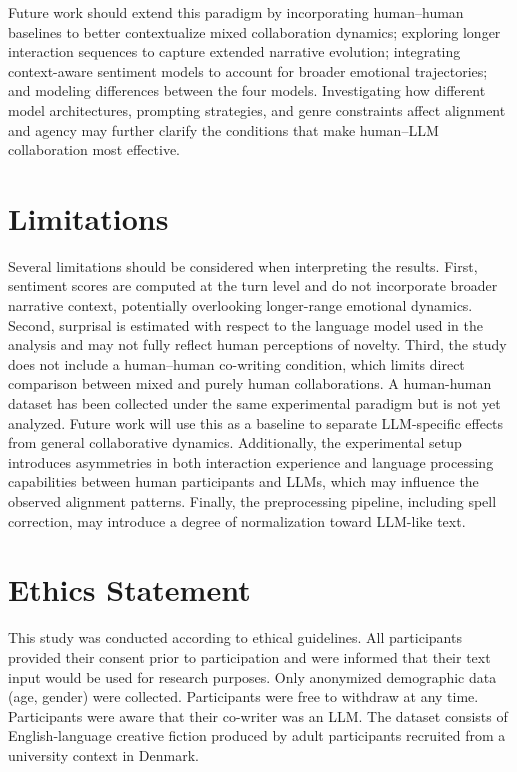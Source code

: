 \documentclass[11pt]{article}
\begin{document}
Future work should extend this paradigm by incorporating human–human baselines to better contextualize mixed collaboration dynamics; exploring longer interaction sequences to capture extended narrative evolution; integrating context-aware sentiment models to account for broader emotional trajectories; and modeling differences between the four models. Investigating how different model architectures, prompting strategies, and genre constraints affect alignment and agency may further clarify the conditions that make human–LLM collaboration most effective.


\section*{Limitations}
Several limitations should be considered when interpreting the results. First, sentiment scores are computed at the turn level and do not incorporate broader narrative context, potentially overlooking longer-range emotional dynamics. Second, surprisal is estimated with respect to the language model used in the analysis and may not fully reflect human perceptions of novelty. Third, the study does not include a human–human co-writing condition, which limits direct comparison between mixed and purely human collaborations. A human-human dataset has been collected under the same experimental paradigm but is not yet analyzed. Future work will use this as a baseline to separate LLM-specific effects from general collaborative dynamics.
Additionally, the experimental setup introduces asymmetries in both interaction experience and language processing capabilities between human participants and LLMs, which may influence the observed alignment patterns. Finally, the preprocessing pipeline, including spell correction, may introduce a degree of normalization toward LLM-like text.

\section*{Ethics Statement}
This study was conducted according to ethical guidelines. All participants provided their consent prior to participation and were informed that their text input would be used for research purposes. Only anonymized demographic data (age, gender) were collected. Participants were free to withdraw at any time. Participants were aware that their co-writer was an LLM. The dataset consists of English-language creative fiction produced by adult participants recruited from a university context in Denmark.
\end{document}
